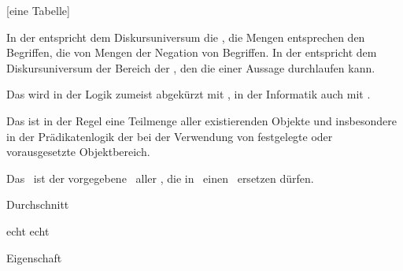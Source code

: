 {{		[eine Tabelle]

		In der  entspricht dem Diskursuniversum die , die Mengen entsprechen den Begriffen, die  von Mengen der Negation von Begriffen. In der  entspricht dem Diskursuniversum der Bereich der , den die  einer  Aussage durchlaufen kann.

		Das  wird in der Logik zumeist abgekürzt mit , in der Informatik auch mit .

		Das  ist in der Regel eine Teilmenge aller existierenden Objekte und insbesondere in der Prädikatenlogik der bei der Verwendung von  festgelegte oder vorausgesetzte Objektbereich.
	}
	Das  \MtsUniversum\ ist der vorgegebene \Bereich\ aller \Objekte, die in \Aussagen\ einen \Parameter\ ersetzen dürfen.
}

\newVerweis     {\Durchschnitt} {\glstext}{Durchschnitt}


\newVerweis     {\echt}  {\glstext}{echt}
\newVerweis[e]  {\echte} {\glstext}{echt}

\newVerweis     {\Eigenschaft}  {\glstext}{Eigenschaft}

